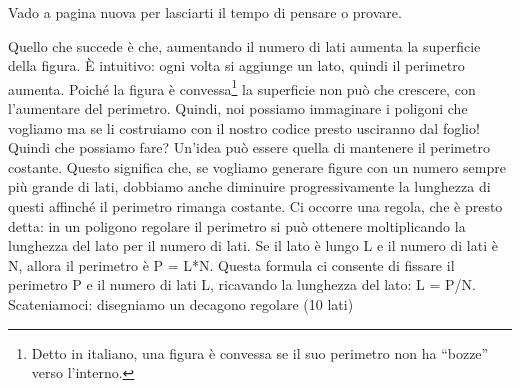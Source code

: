 Vado a pagina nuova per lasciarti il tempo di pensare o provare.

\pagebreak

Quello che succede è che, aumentando il numero di lati aumenta la superficie della figura. È intuitivo: ogni volta si aggiunge un lato, quindi il perimetro aumenta. Poiché la figura è convessa\footnote{Detto in italiano, una figura è convessa se il suo perimetro non ha “bozze” verso l'interno.} la superficie non può che crescere, con l'aumentare del perimetro. Quindi, noi possiamo immaginare i poligoni che vogliamo ma se li costruiamo con il nostro codice presto usciranno dal foglio! Quindi che possiamo fare? Un'idea può essere quella di mantenere il perimetro costante. Questo significa che, se vogliamo generare figure con un numero sempre più grande di lati, dobbiamo anche diminuire progressivamente la lunghezza di questi affinché il perimetro rimanga costante. Ci occorre una regola, che è presto detta: in un poligono regolare il perimetro si può ottenere moltiplicando la lunghezza del lato per il numero di lati. Se il lato è lungo L e il numero di lati è N, allora il perimetro è P = L*N. Questa formula ci consente di fissare il perimetro P e il numero di lati L, ricavando la lunghezza del lato: L = P/N. Scateniamoci: disegniamo un decagono regolare (10 lati)  

